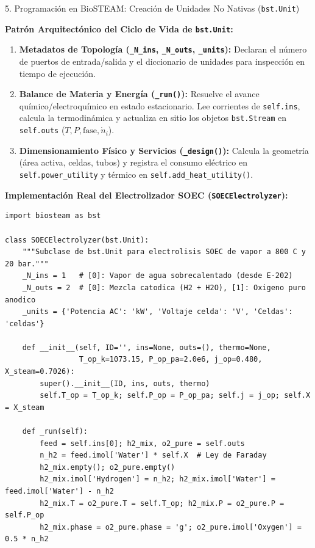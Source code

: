 \documentclass[12pt]{article}
\begin{document}
\begin{minipage}[t]{0.49\linewidth}
\begin{posterbox}[secondaryblue]{5. Programación en BioSTEAM: Creación de Unidades No Nativas (\texttt{bst.Unit})}
        \vspace{6pt}
        \begin{tcolorbox}[colback=tablerowgray, colframe=secondaryblue!50, boxrule=1.5pt, arc=4pt, top=6pt, bottom=6pt]
            \fontsize{13.5}{17}\selectfont
            \textbf{\color{primaryblue}Patrón Arquitectónico del Ciclo de Vida de \texttt{bst.Unit}:}
            \begin{enumerate}[leftmargin=*, itemsep=2.5pt, topsep=2pt]
                \item \textbf{Metadatos de Topología (\texttt{\_N\_ins}, \texttt{\_N\_outs}, \texttt{\_units}):} Declaran el número de puertos de entrada/salida y el diccionario de unidades para inspección en tiempo de ejecución.
                \item \textbf{Balance de Materia y Energía (\texttt{\_run()}):} Resuelve el avance químico/electroquímico en estado estacionario. Lee corrientes de \texttt{self.ins}, calcula la termodinámica y actualiza en sitio los objetos \texttt{bst.Stream} en \texttt{self.outs} ($T, P, \text{fase}, \dot{n}_i$).
                \item \textbf{Dimensionamiento Físico y Servicios (\texttt{\_design()}):} Calcula la geometría (área activa, celdas, tubos) y registra el consumo eléctrico en \texttt{self.power\_utility} y térmico en \texttt{self.add\_heat\_utility()}.
            \end{enumerate}
        \end{tcolorbox}

        \vspace{4pt}
        \textbf{Implementación Real del Electrolizador SOEC (\texttt{SOECElectrolyzer}):}
\begin{lstlisting}[style=biosteamcode]
import biosteam as bst

class SOECElectrolyzer(bst.Unit):
    """Subclase de bst.Unit para electrolisis SOEC de vapor a 800 C y 20 bar."""
    _N_ins = 1   # [0]: Vapor de agua sobrecalentado (desde E-202)
    _N_outs = 2  # [0]: Mezcla catodica (H2 + H2O), [1]: Oxigeno puro anodico
    _units = {'Potencia AC': 'kW', 'Voltaje celda': 'V', 'Celdas': 'celdas'}

    def __init__(self, ID='', ins=None, outs=(), thermo=None,
                 T_op_k=1073.15, P_op_pa=2.0e6, j_op=0.480, X_steam=0.7026):
        super().__init__(ID, ins, outs, thermo)
        self.T_op = T_op_k; self.P_op = P_op_pa; self.j = j_op; self.X = X_steam

    def _run(self):
        feed = self.ins[0]; h2_mix, o2_pure = self.outs
        n_h2 = feed.imol['Water'] * self.X  # Ley de Faraday
        h2_mix.empty(); o2_pure.empty()
        h2_mix.imol['Hydrogen'] = n_h2; h2_mix.imol['Water'] = feed.imol['Water'] - n_h2
        h2_mix.T = o2_pure.T = self.T_op; h2_mix.P = o2_pure.P = self.P_op
        h2_mix.phase = o2_pure.phase = 'g'; o2_pure.imol['Oxygen'] = 0.5 * n_h2


\end{lstlisting}
\end{posterbox}
\end{minipage}
\end{document}
